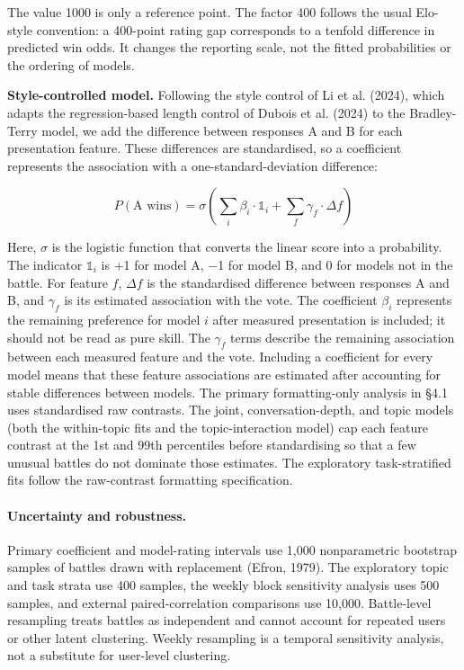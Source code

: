 \documentclass[
]{article}
\newcommand{\indicator}{\mathds{1}}
\newcommand{\indicator}{\mathbb{1}}
\begin{document}
The value 1000 is only a reference point. The factor 400 follows the
usual Elo-style convention: a 400-point rating gap corresponds to a
tenfold difference in predicted win odds. It changes the reporting
scale, not the fitted probabilities or the ordering of models.

\textbf{Style-controlled model.} Following the style control of Li et
al. (2024), which adapts the regression-based length control of Dubois
et al. (2024) to the Bradley-Terry model, we add the difference between
responses A and B for each presentation feature. These differences are
standardised, so a coefficient represents the association with a
one-standard-deviation difference:

\[P(\text{A wins}) = \sigma\left(\sum_i \beta_i \cdot \indicator_i + \sum_f \gamma_f \cdot \Delta f\right)\]

Here, \(\sigma\) is the logistic function that converts the linear score
into a probability. The indicator \(\indicator_i\) is +1 for model A,
−1 for model B, and 0 for models not in the battle. For feature \(f\),
\(\Delta f\) is the standardised difference between responses A and B,
and \(\gamma_f\) is its estimated association with the vote. The
coefficient \(\beta_i\) represents the remaining preference for model \(i\)
after measured presentation is included; it should not be read as pure
skill. The \(\gamma_f\) terms describe the remaining association between
each measured feature and the vote. Including a coefficient for every
model means that these feature associations are estimated after
accounting for stable differences between models. The primary
formatting-only analysis in §4.1 uses standardised raw contrasts.
The joint, conversation-depth, and topic models (both the within-topic
fits and the topic-interaction model) cap each feature contrast at the 1st and 99th percentiles before standardising so
that a few unusual battles do not dominate those estimates. The
exploratory task-stratified fits follow the raw-contrast formatting
specification.

\paragraph{Uncertainty and robustness.}\label{bootstrap-inference}

Primary coefficient and model-rating intervals use 1,000 nonparametric
bootstrap samples of battles drawn with replacement (Efron, 1979). The
exploratory topic and task strata use 400 samples, the weekly block
sensitivity analysis uses 500 samples, and external paired-correlation
comparisons use 10,000. Battle-level resampling treats battles as
independent and cannot account for repeated users or other latent
clustering. Weekly resampling is a temporal sensitivity analysis, not a
substitute for user-level clustering.
\end{document}
